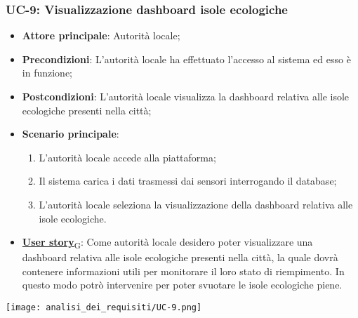 \subsubsection{UC-9: Visualizzazione dashboard isole ecologiche}
\begin{itemize}
	\item \textbf{Attore principale}: Autorità locale;
	\item \textbf{Precondizioni}: L'autorità locale ha effettuato l'accesso al sistema ed esso è in funzione;
	\item \textbf{Postcondizioni}: L'autorità locale visualizza la dashboard relativa
	      alle isole ecologiche presenti nella città;
	\item \textbf{Scenario principale}:
	      \begin{enumerate}
		      \item L'autorità locale accede alla piattaforma;
		      \item Il sistema carica i dati trasmessi dai sensori interrogando il database;
		      \item L'autorità locale seleziona la visualizzazione della dashboard relativa alle isole ecologiche.
	      \end{enumerate}
	\item \href{https://7last.github.io/docs/rtb/documentazione-interna/glossario\#user-story}{\textbf{User story}\textsubscript{G}}:
	      Come autorità locale desidero poter visualizzare una dashboard relativa alle isole ecologiche presenti nella città, la quale
	      dovrà contenere informazioni utili per monitorare il loro stato di riempimento. In questo modo potrò intervenire
	      per poter svuotare le isole ecologiche piene.
\end{itemize}
\begin{center}
	\texttt{[image: analisi\_dei\_requisiti/UC-9.png]}
\end{center}

